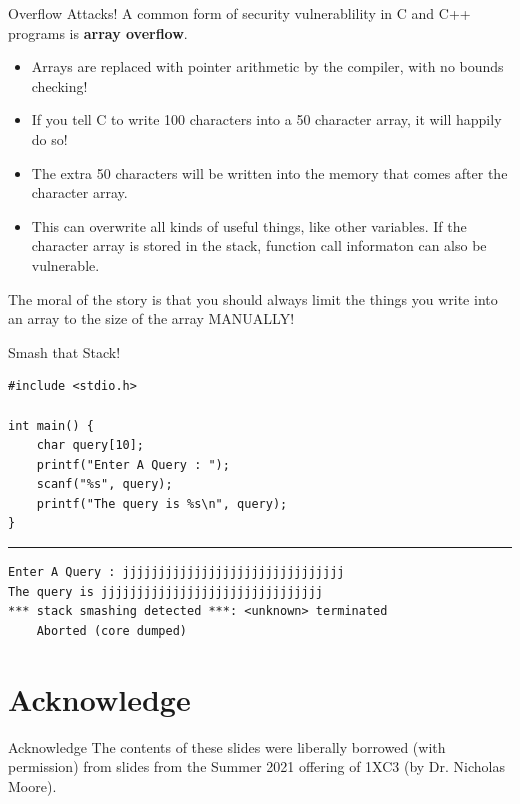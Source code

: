 \documentclass[11pt]{beamer}
\begin{document}
\begin{frame}{Overflow Attacks!}
A common form of security vulnerablility in C and C++ programs is \textbf{array overflow}. 
\begin{itemize}
\item Arrays are replaced with pointer arithmetic by the compiler, with no bounds checking!  
\item If you tell C to write 100 characters into a 50 character array, it will happily do so! 
\item The extra 50 characters will be written into the memory that comes after the character array.
\item This can overwrite all kinds of useful things, like other variables.  If the character array is stored in the stack, function call informaton can also be vulnerable.  
\end{itemize}
The moral of the story is that you should always limit the things you write into an array to the size of the array MANUALLY! 
\end{frame}

\begin{frame}[fragile=singleslide]{Smash that Stack!}
\begin{lstlisting}[style = C]
#include <stdio.h>

int main() {
	char query[10];
	printf("Enter A Query : ");
	scanf("%s", query);
	printf("The query is %s\n", query);
}
\end{lstlisting}
\hrule
\begin{lstlisting}[style=terminal]
Enter A Query : jjjjjjjjjjjjjjjjjjjjjjjjjjjjjjj
The query is jjjjjjjjjjjjjjjjjjjjjjjjjjjjjjj
*** stack smashing detected ***: <unknown> terminated
	Aborted (core dumped)
\end{lstlisting}
\end{frame}

\section[Acknowledge]{Acknowledge}
\begin{frame}{Acknowledge}
\center
\vspace{8em}
The contents of these slides were liberally borrowed (with permission) from slides from the Summer 2021 offering of 1XC3 (by Dr. Nicholas Moore).  
\end{frame}
\end{document}
